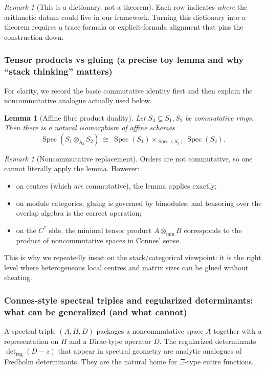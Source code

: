 \documentclass[11pt,oneside]{amsbook}
\numberwithin{equation}{section}
\theoremstyle{plain}
\newtheorem{lemma}[theorem]{Lemma}
\theoremstyle{definition}
\theoremstyle{remark}
\newtheorem{remark}[theorem]{Remark}
\DeclareMathOperator{\Spec}{\mathrm{Spec}}
\begin{document}
\begin{remark}[This is a dictionary, not a theorem]
Each row indicates \emph{where} the arithmetic datum could live in our framework.
Turning this dictionary into a theorem requires a trace formula or explicit-formula alignment that pins the construction down.
\end{remark}

\subsubsection{Tensor products vs gluing (a precise toy lemma and why ``stack thinking'' matters)}

For clarity, we record the basic commutative identity first and then explain the noncommutative analogue actually used below.

\begin{lemma}[Affine fibre product duality]
Let $S_3\subseteq S_1,S_2$ be commutative rings.
Then there is a natural isomorphism of affine schemes
\[
\Spec(S_1\otimes_{S_3}S_2)\ \cong\ \Spec(S_1)\times_{\Spec(S_3)}\Spec(S_2).
\]
\end{lemma}

\begin{remark}[Noncommutative replacement]
Orders are not commutative, so one cannot literally apply the lemma.
However:
\begin{itemize}
\item on centres (which \emph{are} commutative), the lemma applies exactly;
\item on module categories, gluing is governed by bimodules, and tensoring over the overlap algebra is the correct operation;
\item on the $C^\ast$ side, the minimal tensor product $A\otimes_{\min}B$ corresponds to the product of noncommutative spaces in Connes' sense.
\end{itemize}
This is why we repeatedly insist on the stack/categorical viewpoint:
it is the right level where heterogeneous local centres and matrix sizes can be glued without cheating.
\end{remark}

\subsubsection{Connes-style spectral triples and regularized determinants: what can be generalized (and what cannot)}

A spectral triple $(A,H,D)$ packages a noncommutative space $A$ together with a representation on $H$ and a Dirac-type operator $D$.
The regularized determinants $\det_{\mathrm{reg}}(D-z)$ that appear in spectral geometry are analytic analogues of Fredholm determinants.
They are the natural home for $\Xi$-type entire functions.
\end{document}
